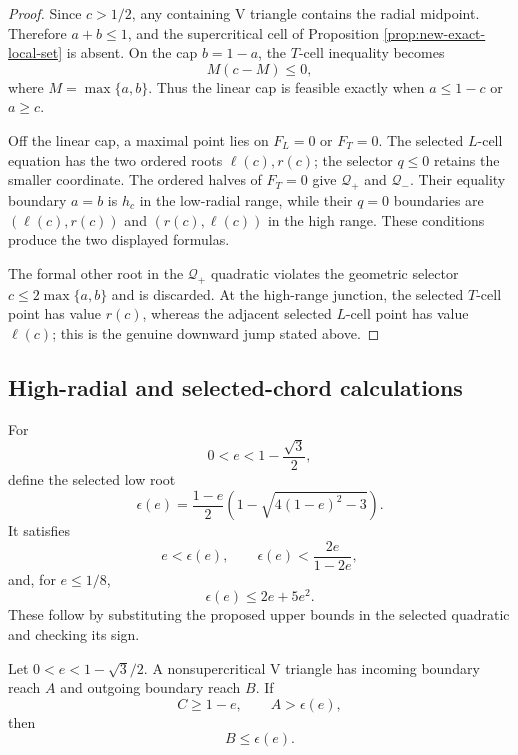 \begin{proof}
Since $c>1/2$, any containing V triangle contains the radial midpoint.
Therefore $a+b\le1$, and the supercritical cell of Proposition
\ref{prop:new-exact-local-set} is absent.  On the cap $b=1-a$, the $T$-cell
inequality becomes
\[
 M(c-M)\le0,
\]
where $M=\max\{a,b\}$.  Thus the linear cap is feasible exactly when
$a\le1-c$ or $a\ge c$.

Off the linear cap, a maximal point lies on $F_L=0$ or $F_T=0$.  The selected
$L$-cell equation has the two ordered roots $\ell(c),r(c)$; the selector
$q\le0$ retains the smaller coordinate.  The ordered halves of $F_T=0$ give
$\mathcal Q_+$ and $\mathcal Q_-$.  Their equality boundary $a=b$ is $h_c$ in the low-radial
range, while their $q=0$ boundaries are
$(\ell(c),r(c))$ and $(r(c),\ell(c))$ in the high range.  These conditions
produce the two displayed formulas.

The formal other root in the $\mathcal Q_+$ quadratic violates the geometric selector
$c\le2\max\{a,b\}$ and is discarded.  At the high-range junction, the
selected $T$-cell point has value $r(c)$, whereas the adjacent selected
$L$-cell point has value $\ell(c)$; this is the genuine downward jump stated
above.
\end{proof}

\subsection{High-radial and selected-chord calculations}

For
\[
 0<e<1-\frac{\sqrt3}{2},
\]
define the selected low root
\begin{equation}
 \epsilon(e)=\frac{1-e}{2}
 \left(1-\sqrt{4(1-e)^2-3}\right).
\label{eq:selected-low-root}
\end{equation}
It satisfies
\begin{equation}
 e<\epsilon(e),\qquad
 \epsilon(e)<\frac{2e}{1-2e},
\label{eq:selected-low-root-basic-bounds}
\end{equation}
and, for $e\le1/8$,
\begin{equation}
 \epsilon(e)\le2e+5e^2.
\label{eq:selected-low-root-small-bound}
\end{equation}
These follow by substituting the proposed upper bounds in the selected
quadratic and checking its sign.

\begin{lemma}
\label{lem:new-direct-threshold}
Let $0<e<1-\sqrt3/2$. A nonsupercritical V triangle has incoming boundary reach $A$ and
outgoing boundary reach $B$.  If
\[
 C\ge1-e,
 \qquad
 A>\epsilon(e),
\]
then
\[
 \boxed{B\le\epsilon(e).}
\]
\end{lemma}

